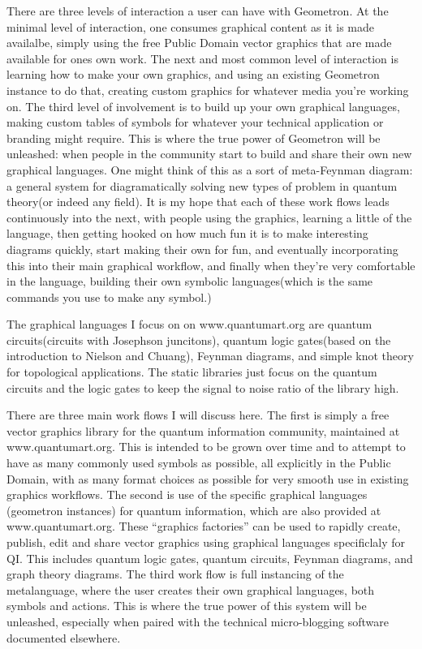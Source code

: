 \documentclass[11pt]{article}
\begin{document}
There are three levels of interaction a user can have with Geometron.  At the minimal level of interaction, one consumes graphical content as it is made availalbe, simply using the free Public Domain vector graphics that are made available for ones own work.  The next and most common level of interaction is learning how to make your own graphics, and using an existing Geometron instance to do that, creating custom graphics for whatever media you're working on.  The third level of involvement is to build up your own graphical languages, making custom tables of symbols for whatever your technical application or branding might require.  This is where the true power of Geometron will be unleashed: when people in the community start to build and share their own new graphical languages.  One might think of this as a sort of meta-Feynman diagram: a general system for diagramatically solving new types of problem in quantum theory(or indeed any field).  It is my hope that each of these work flows leads continuously into the next, with people using the graphics, learning a little of the language, then getting hooked on how much fun it is to make interesting diagrams quickly, start making their own for fun, and eventually incorporating this into their main graphical workflow, and finally when they're very comfortable in the language, building their own symbolic languages(which is the same commands you use to make any symbol.)

The graphical languages I focus on on www.quantumart.org are quantum circuits(circuits with Josephson juncitons), quantum logic gates(based on the introduction to Nielson and Chuang), Feynman diagrams, and simple knot theory for topological applications.  The static libraries just focus on the quantum circuits and the logic gates to keep the signal to noise ratio of the library high.  

    There are three main work flows I will discuss here.  The first is simply a free vector graphics library for the quantum information community, maintained at www.quantumart.org.  This is intended to be grown over time and to attempt to have as many commonly used symbols as possible, all explicitly in the Public Domain, with as many format choices as possible for very smooth use in existing graphics workflows.  The second is use of the specific graphical languages (geometron instances) for quantum information, which are also provided at www.quantumart.org.  These ``graphics factories'' can be used to rapidly create, publish, edit and share vector graphics using graphical languages specificlaly for QI.  This includes quantum logic gates, quantum circuits, Feynman diagrams, and graph theory diagrams. The third work flow is full instancing of the metalanguage, where the user creates their own graphical languages, both symbols and actions.  This is where the true power of this system will be unleashed, especially when paired with the technical micro-blogging software documented elsewhere.  
\end{document}
